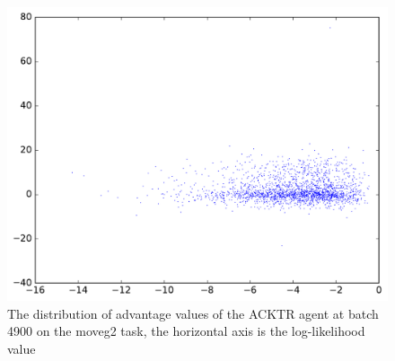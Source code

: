 \begin{figure}[!htbp]
	\includegraphics[width=\textwidth]{images/vis_stats_4900.pdf}
	\centering
	\caption{The distribution of advantage values of the ACKTR agent at batch 4900 on the moveg2 task, the horizontal axis is the log-likelihood value}
	\label{vis_stats_4900}
\end{figure}

